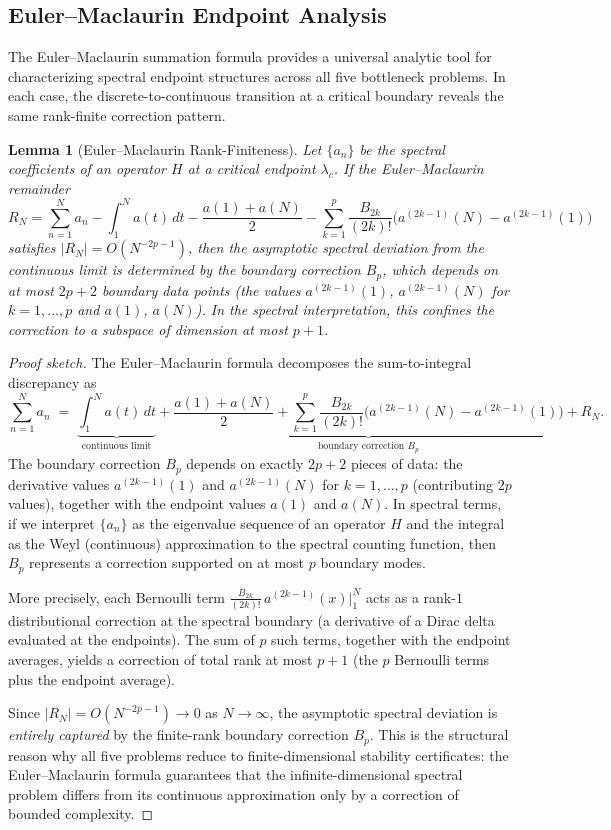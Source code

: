 \documentclass[12pt,a4paper]{article}
\newtheorem{lemma}[theorem]{Lemma}
\theoremstyle{definition}
\theoremstyle{remark}
\begin{document}
\subsection{Euler--Maclaurin Endpoint Analysis}
\label{sec:euler-maclaurin}

The Euler--Maclaurin summation formula provides a universal analytic tool for characterizing spectral endpoint structures across all five bottleneck problems. In each case, the discrete-to-continuous transition at a critical boundary reveals the same rank-finite correction pattern.

\begin{lemma}[Euler--Maclaurin Rank-Finiteness]
\label{lem:em-rank}
Let $\{a_n\}$ be the spectral coefficients of an operator $H$ at a critical endpoint $\lambda_c$. If the Euler--Maclaurin remainder
\[
R_N = \sum_{n=1}^{N} a_n - \int_1^N a(t)\,dt - \frac{a(1)+a(N)}{2} - \sum_{k=1}^{p} \frac{B_{2k}}{(2k)!}\bigl(a^{(2k-1)}(N) - a^{(2k-1)}(1)\bigr)
\]
satisfies $|R_N| = O(N^{-2p-1})$, then the asymptotic spectral deviation from the continuous limit is determined by the boundary correction $B_p$, which depends on at most $2p+2$ boundary data points \textup{(}the values $a^{(2k-1)}(1)$, $a^{(2k-1)}(N)$ for $k = 1,\ldots,p$ and $a(1)$, $a(N)$\textup{)}. In the spectral interpretation, this confines the correction to a subspace of dimension at most $p+1$.
\end{lemma}

\begin{proof}[Proof sketch]
The Euler--Maclaurin formula decomposes the sum-to-integral discrepancy as
\[
\sum_{n=1}^{N} a_n \;=\; \underbrace{\int_1^N a(t)\,dt}_{\text{continuous limit}} + \underbrace{\frac{a(1)+a(N)}{2} + \sum_{k=1}^{p} \frac{B_{2k}}{(2k)!}\bigl(a^{(2k-1)}(N) - a^{(2k-1)}(1)\bigr)}_{\text{boundary correction } B_p} + R_N.
\]
The boundary correction $B_p$ depends on exactly $2p+2$ pieces of data: the derivative values $a^{(2k-1)}(1)$ and $a^{(2k-1)}(N)$ for $k = 1, \ldots, p$ (contributing $2p$ values), together with the endpoint values $a(1)$ and $a(N)$. In spectral terms, if we interpret $\{a_n\}$ as the eigenvalue sequence of an operator $H$ and the integral as the Weyl (continuous) approximation to the spectral counting function, then $B_p$ represents a correction supported on at most $p$ boundary modes.

More precisely, each Bernoulli term $\frac{B_{2k}}{(2k)!}\,a^{(2k-1)}(x)\big|_1^N$ acts as a rank-$1$ distributional correction at the spectral boundary (a derivative of a Dirac delta evaluated at the endpoints). The sum of $p$ such terms, together with the endpoint averages, yields a correction of total rank at most $p+1$ (the $p$ Bernoulli terms plus the endpoint average).

Since $|R_N| = O(N^{-2p-1}) \to 0$ as $N \to \infty$, the asymptotic spectral deviation is \emph{entirely captured} by the finite-rank boundary correction $B_p$. This is the structural reason why all five problems reduce to finite-dimensional stability certificates: the Euler--Maclaurin formula guarantees that the infinite-dimensional spectral problem differs from its continuous approximation only by a correction of bounded complexity.
\end{proof}
\end{document}
